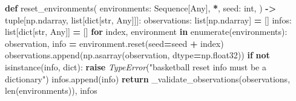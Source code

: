 \documentclass[
  chinese,
  11pt,
  letterpaper,
]{article}
\newenvironment{Shaded}{\begin{snugshade}}{\end{snugshade}}
\newcommand{\BuiltInTok}[1]{#1}
\newcommand{\ControlFlowTok}[1]{\textcolor[rgb]{0.13,0.29,0.53}{\textbf{#1}}}
\newcommand{\KeywordTok}[1]{\textcolor[rgb]{0.13,0.29,0.53}{\textbf{#1}}}
\newcommand{\NormalTok}[1]{#1}
\newcommand{\OperatorTok}[1]{\textcolor[rgb]{0.81,0.36,0.00}{\textbf{#1}}}
\newcommand{\PreprocessorTok}[1]{\textcolor[rgb]{0.56,0.35,0.01}{\textit{#1}}}
\newcommand{\StringTok}[1]{\textcolor[rgb]{0.31,0.60,0.02}{#1}}
\renewenvironment{Shaded}{\par\smallskip}{\par\smallskip}
\begin{document}
\begin{Shaded}
\begin{Highlighting}[]
\KeywordTok{def}\NormalTok{ reset\_environments(}
\NormalTok{    environments: Sequence[Any],}
    \OperatorTok{*}\NormalTok{,}
\NormalTok{    seed: }\BuiltInTok{int}\NormalTok{,}
\NormalTok{) }\OperatorTok{{-}\textgreater{}} \BuiltInTok{tuple}\NormalTok{[np.ndarray, }\BuiltInTok{list}\NormalTok{[}\BuiltInTok{dict}\NormalTok{[}\BuiltInTok{str}\NormalTok{, Any]]]:}
\NormalTok{    observations: }\BuiltInTok{list}\NormalTok{[np.ndarray] }\OperatorTok{=}\NormalTok{ []}
\NormalTok{    infos: }\BuiltInTok{list}\NormalTok{[}\BuiltInTok{dict}\NormalTok{[}\BuiltInTok{str}\NormalTok{, Any]] }\OperatorTok{=}\NormalTok{ []}
    \ControlFlowTok{for}\NormalTok{ index, environment }\KeywordTok{in} \BuiltInTok{enumerate}\NormalTok{(environments):}
\NormalTok{        observation, info }\OperatorTok{=}\NormalTok{ environment.reset(seed}\OperatorTok{=}\NormalTok{seed }\OperatorTok{+}\NormalTok{ index)}
\NormalTok{        observations.append(np.asarray(observation, dtype}\OperatorTok{=}\NormalTok{np.float32))}
        \ControlFlowTok{if} \KeywordTok{not} \BuiltInTok{isinstance}\NormalTok{(info, }\BuiltInTok{dict}\NormalTok{):}
            \ControlFlowTok{raise} \PreprocessorTok{TypeError}\NormalTok{(}\StringTok{"basketball reset info must be a dictionary"}\NormalTok{)}
\NormalTok{        infos.append(info)}
    \ControlFlowTok{return}\NormalTok{ \_validate\_observations(observations, }\BuiltInTok{len}\NormalTok{(environments)), infos}



\end{Highlighting}
\end{Shaded}
\end{document}
